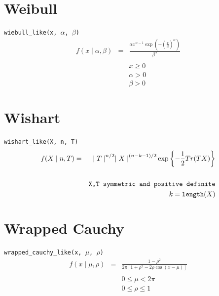 \documentclass[]{book}
\begin{document}
\section*{Weibull}
\verb=wiebull_like(x, =$\alpha$\verb=, =$\beta$\verb=)=
\begin{eqnarray*}
f(x \mid \alpha, \beta) &=& \frac{\alpha x^{\alpha - 1} \exp(-(\frac{x}{\beta})^{\alpha})}{\beta^\alpha} \\
\\
&& x \ge 0 \\
&& \alpha > 0 \\
&& \beta > 0
\end{eqnarray*}

\section*{Wishart}
\verb=wishart_like(X, n, T)=
\begin{eqnarray*}
f(X \mid n, T) &=& {\mid T \mid}^{n/2}{\mid X \mid}^{(n-k-1)/2} \exp\left\{ -\frac{1}{2} Tr(TX) \right\}\\
\\
&& \verb=X,T symmetric and positive definite= \\
&& k = \verb=length=(X)
\end{eqnarray*}

\section*{Wrapped Cauchy}
\verb=wrapped_cauchy_like(x, =$\mu$\verb=, =$\rho$\verb=)=
\begin{eqnarray*}
f(x \mid \mu, \rho) &=& \frac{1-\rho^2}{2\pi [1 + \rho^2 - 2\rho\cos(x-\mu)]} \\
\\
&& 0 \le \mu < 2\pi \\
&& 0 \le \rho \le 1
\end{eqnarray*}
\end{document}
